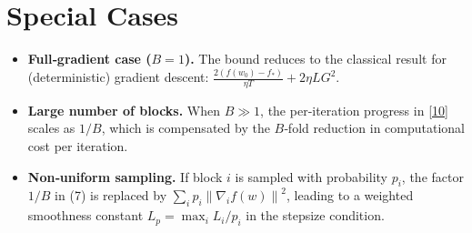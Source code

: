 \documentclass{article}
\newcommand{\norm}[1]{\left\lVert#1\right\rVert}
\begin{document}
\section*{Special Cases}
\begin{itemize}
\item \textbf{Full‑gradient case ($B=1$).} The bound reduces to the classical result for (deterministic) gradient descent: $\frac{2(f(w_0)-f_*)}{\eta T}+2\eta L G^{2}$.
\item \textbf{Large number of blocks.} When $B\gg 1$, the per‑iteration progress in \eqref{10} scales as $1/B$, which is compensated by the $B$‑fold reduction in computational cost per iteration.
\item \textbf{Non‑uniform sampling.} If block $i$ is sampled with probability $p_i$, the factor $1/B$ in (7) is replaced by $\sum_i p_i \norm{\nabla_i f(w)}^{2}$, leading to a weighted smoothness constant $L_{p} = \max_i L_i/p_i$ in the stepsize condition.
\end{itemize}
\end{document}
